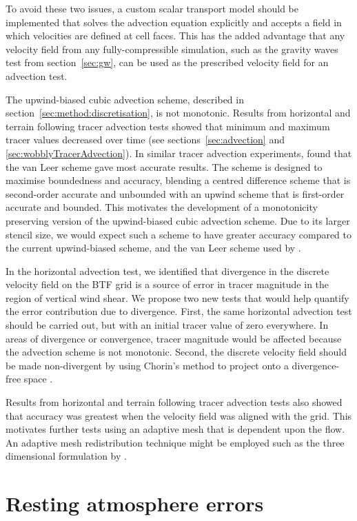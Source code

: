 To avoid these two issues, a custom scalar transport model should be implemented that solves the advection equation explicitly and accepts a field in which velocities are defined at cell faces.  This has the added advantage that any velocity field from any fully-compressible simulation, such as the gravity waves test from section~\ref{sec:gw}, can be used as the prescribed velocity field for an advection test.

The upwind-biased cubic advection scheme, described in section~\ref{sec:method:discretisation}, is not monotonic.  Results from horizontal and terrain following tracer advection tests showed that minimum and maximum tracer values decreased over time (see sections~\ref{sec:advection} and \ref{sec:wobblyTracerAdvection}).
In similar tracer advection experiments, \textcite{jones2013} found that the van Leer scheme gave most accurate results.  The scheme is designed to maximise boundedness and accuracy, blending a centred difference scheme that is second-order accurate and unbounded with an upwind scheme that is first-order accurate and bounded.  This motivates the development of a monotonicity preserving version of the upwind-biased cubic advection scheme.  Due to its larger stencil size, we would expect such a scheme to have greater accuracy compared to the current upwind-biased scheme, and the van Leer scheme used by \textcite{jones2013}.

In the horizontal advection test, we identified that divergence in the discrete velocity field on the BTF grid is a source of error in tracer magnitude in the region of vertical wind shear.  We propose two new tests that would help quantify the error contribution due to divergence.  First, the same horizontal advection test should be carried out, but with an initial tracer value of zero everywhere.  In areas of divergence or convergence, tracer magnitude would be affected because the advection scheme is not monotonic.  Second, the discrete velocity field should be made non-divergent by using Chorin's method to project onto a divergence-free space \autocite{chorin1968}.

Results from horizontal and terrain following tracer advection tests also showed that accuracy was greatest when the velocity field was aligned with the grid.  This motivates further tests using an adaptive mesh that is dependent upon the flow.  An adaptive mesh redistribution technique might be employed such as the three dimensional formulation by \textcite{browne2014}.

\section{Resting atmosphere errors}
\label{sec:further-work:resting}

